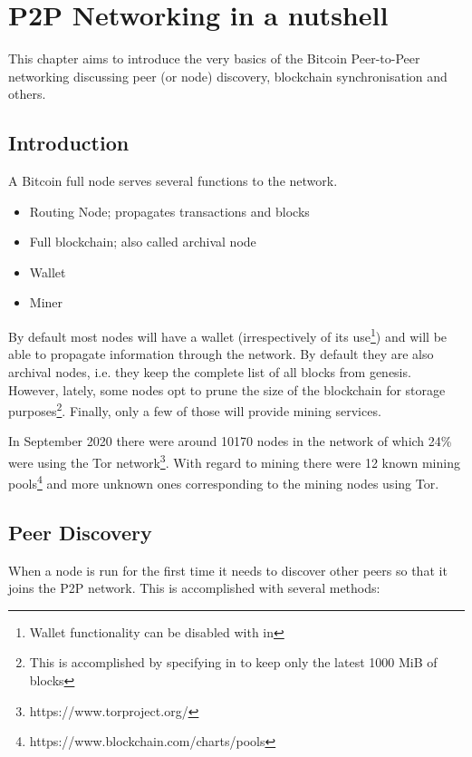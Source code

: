 \chapter{P2P Networking in a nutshell}

\begin{summary}
This chapter aims to introduce the very basics of the Bitcoin Peer-to-Peer networking discussing peer (or node) discovery, blockchain synchronisation and others. 
\end{summary}

\section{Introduction}
A Bitcoin full node serves several functions to the network.

\begin{itemize}
\item Routing Node; propagates transactions and blocks
\item Full blockchain; also called archival node
\item Wallet
\item Miner
\end{itemize}

By default most nodes will have a wallet (irrespectively of its use\footnote{Wallet functionality can be disabled with  in }) and will be able to propagate information through the network. By default they are also archival nodes, i.e. they keep the complete list of all blocks from genesis. However, lately, some nodes opt to prune the size of the blockchain for storage purposes\footnote{This is accomplished by specifying  in  to keep only the latest 1000 MiB of blocks}. Finally, only a few of those will provide mining services.

In September 2020 there were around 10170 nodes in the network of which 24\% were using the Tor network\footnote{https://www.torproject.org/}. With regard to mining there were 12 known mining pools\footnote{https://www.blockchain.com/charts/pools} and more unknown ones corresponding to the mining nodes using Tor.


\section{Peer Discovery}
When a node is run for the first time it needs to discover other peers so that it joins the P2P network. This is accomplished with several methods:


